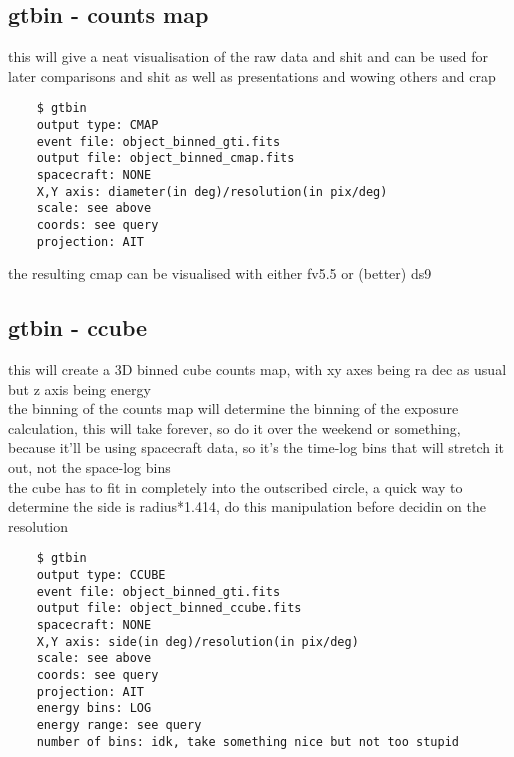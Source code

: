 \documentclass{article}
\begin{document}
\subsection{gtbin - counts map}%
this will give a neat visualisation of the raw data and shit and can be used for later comparisons and shit as well as presentations and wowing others and crap
\begin{verbatim}
    $ gtbin
    output type: CMAP
    event file: object_binned_gti.fits
    output file: object_binned_cmap.fits
    spacecraft: NONE
    X,Y axis: diameter(in deg)/resolution(in pix/deg)
    scale: see above
    coords: see query
    projection: AIT
\end{verbatim}
the resulting cmap can be visualised with either fv5.5 or (better) ds9
\subsection{gtbin - ccube}%
this will create a 3D binned cube counts map, with xy axes being ra dec as usual but z axis being energy\\
the binning of the counts map will determine the binning of the exposure calculation, this will take forever, so do it over the weekend or something, because it'll be using spacecraft data, so it's the time-log bins that will stretch it out, not the space-log bins\\
the cube has to fit in completely into the outscribed circle, a quick way to determine the side is radius*1.414, do this manipulation before decidin on the resolution
\begin{verbatim}
    $ gtbin
    output type: CCUBE
    event file: object_binned_gti.fits
    output file: object_binned_ccube.fits
    spacecraft: NONE
    X,Y axis: side(in deg)/resolution(in pix/deg)
    scale: see above
    coords: see query
    projection: AIT
    energy bins: LOG
    energy range: see query
    number of bins: idk, take something nice but not too stupid
\end{verbatim}
\end{document}
